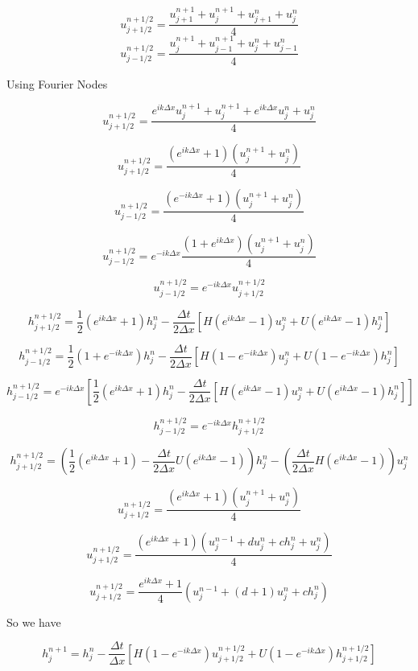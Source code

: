 \documentclass[12pt]{article}
\begin{document}
\[u^{n+1/2}_{j+1/2} = \frac{u^{n+1}_{j+1} + u^{n+1}_{j}+u^{n}_{j+1} + u^{n}_{j}}{4}\]
\[u^{n+1/2}_{j-1/2} = \frac{u^{n+1}_{j} + u^{n+1}_{j-1}+u^{n}_{j} + u^{n}_{j-1}}{4}\]

Using Fourier Nodes

\[u^{n+1/2}_{j+1/2} = \frac{e^{ik\Delta x}u^{n+1}_{j} + u^{n+1}_{j}+e^{ik\Delta x}u^{n}_{j} + u^{n}_{j}}{4}\]

\[u^{n+1/2}_{j+1/2} = \frac{\left(e^{ik\Delta x} +1\right)\left(u^{n+1}_{j} + u^{n}_{j}\right)}{4}\]

\[u^{n+1/2}_{j-1/2} = \frac{\left(e^{-ik\Delta x} +1\right)\left(u^{n+1}_{j} + u^{n}_{j}\right)}{4}\]

\[u^{n+1/2}_{j-1/2} = e^{-ik\Delta x} \frac{\left(1 +e^{ik\Delta x}\right)\left(u^{n+1}_{j} + u^{n}_{j}\right)}{4}\]

\[u^{n+1/2}_{j-1/2} = e^{-ik\Delta x} u^{n+1/2}_{j+1/2}\]

\[
h^{n+1/2}_{j+1/2} = \frac{1}{2}\left(e^{ik\Delta x} + 1\right)h^n_j - \frac{\Delta t}{2\Delta x}\left[H\left(e^{ik\Delta x} - 1\right)u^n_j + U\left(e^{ik\Delta x} - 1\right)h^n_j\right]
\]

\[
h^{n+1/2}_{j-1/2} = \frac{1}{2}\left(1  + e^{-ik\Delta x}\right)h^n_j - \frac{\Delta t}{2\Delta x}\left[H\left(1 - e^{-ik\Delta x}\right)u^n_j + U\left(1 - e^{-ik\Delta x}\right)h^n_j\right]
\]

\[
h^{n+1/2}_{j-1/2} = e^{-ik\Delta x}\left[\frac{1}{2}\left(e^{ik\Delta x}  +1\right)h^n_j - \frac{\Delta t}{2\Delta x}\left[H\left(e^{ik\Delta x} - 1\right)u^n_j + U\left(e^{ik\Delta x} - 1\right)h^n_j\right] \right]
\]

\[
h^{n+1/2}_{j-1/2} = e^{-ik\Delta x}h^{n+1/2}_{j+1/2}
\]

\[
h^{n+1/2}_{j+1/2} = \left(\frac{1}{2}\left(e^{ik\Delta x} + 1\right) - \frac{\Delta t}{2\Delta x}U\left(e^{ik\Delta x} - 1\right)\right)h^n_j   - \left(\frac{\Delta t}{2\Delta x}H\left(e^{ik\Delta x} - 1\right)\right)u^n_j
\]


\[u^{n+1/2}_{j+1/2} = \frac{\left(e^{ik\Delta x} +1\right)\left(u^{n+1}_{j} + u^{n}_{j}\right)}{4}\]

\[u^{n+1/2}_{j+1/2} = \frac{\left(e^{ik\Delta x} +1\right)\left(u^{n-1}_j   +du^n_j   +c h^n_j + u^{n}_{j}\right)}{4}\]

\[u^{n+1/2}_{j+1/2} = \frac{e^{ik\Delta x} +1}{4}\left(u^{n-1}_j   +(d+1)u^n_j   +c h^n_j\right)\]

So we have 

\[h^{n+1}_{j} = h^n_j - \frac{\Delta t}{\Delta x}\left[H(1 -e^{-ik\Delta x} )u^{n+1/2}_{j+1/2} + U(1 -e^{-ik\Delta x} )h^{n+1/2}_{j+1/2}\right]\]
\end{document}
